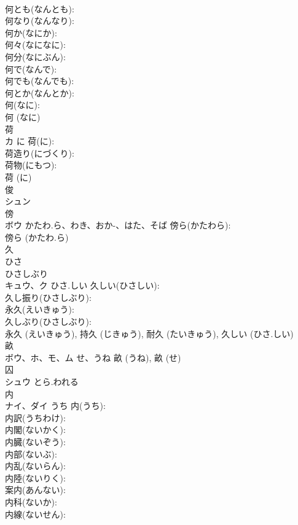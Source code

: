 \documentclass[8pt]{extreport}
\begin{document}
\begin{CJK}{UTF8}{min}
\\	何とも(なんとも): 
\\	何なり(なんなり): 
\\	何か(なにか): 
\\	何々(なになに): 
\\	何分(なにぶん): 
\\	何で(なんで): 
\\	何でも(なんでも): 
\\	何とか(なんとか): 
\\	何(なに): 
\\	何 (なに)
\\	荷			
\\	カ	に	荷(に): 
\\	荷造り(にづくり): 
\\	荷物(にもつ): 
\\	荷 (に)
\\	俊			
\\	シュン			
\\	傍			
\\	ボウ	かたわ.ら、わき、おか-、はた、そば	傍ら(かたわら): 
\\	傍ら (かたわ.ら)
\\	久			
\\	ひさ 
\\	ひさしぶり 
\\	キュウ、ク	ひさ.しい	久しい(ひさしい): 
\\	久し振り(ひさしぶり): 
\\	永久(えいきゅう): 
\\	久しぶり(ひさしぶり): 
\\	永久 (えいきゅう), 持久 (じきゅう), 耐久 (たいきゅう), 久しい (ひさ.しい)
\\	畝			
\\	ボウ、ホ、モ、ム	せ、うね		畝 (うね), 畝 (せ)
\\	囚			
\\	シュウ	とら.われる		
\\	内			
\\	ナイ、ダイ	うち	内(うち): 
\\	内訳(うちわけ): 
\\	内閣(ないかく): 
\\	内臓(ないぞう): 
\\	内部(ないぶ): 
\\	内乱(ないらん): 
\\	内陸(ないりく): 
\\	案内(あんない): 
\\	内科(ないか): 
\\	内線(ないせん): 

\end{CJK}
\end{document}
